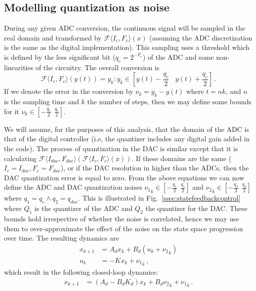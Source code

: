 \documentclass[runningheads,a4paper]{llncs}
\begin{document}
\subsection{Modelling quantization as noise} \label{appendix:quantization-noise}

During any given ADC conversion, the continuous signal will be sampled in
the real domain and transformed by $\mathcal{F}\langle I_{c},F_{c} \rangle
(x)$ (assuming the ADC discretization is the same as the digital
implementation).  This sampling uses a threshold which is defined by the
less significant bit ($q_{c}=2^{-F_c}$) of the ADC and some non-linearities
of the circuitry.  The overall conversion is
%
$$\mathcal{F}\langle I_{c},F_{c} \rangle(y(t)) = y_k :
y_k \in \left[y(t)-\frac{q_{c}}{2}\ \ \ \ y(t)+\frac{q_{c}}{2}\right] \,.$$
%
If we denote the error in the conversion by $\nu_k=y_k-y(t)$ where $t = nk$,
and $n$ is the sampling time and $k$ the number of steps, then we may define
some bounds for it $\nu_k \in [-\frac{q_{c}}{2}\ \ \frac{q_{c}}{2}]$.

We will assume, for the purposes of this analysis, that the domain of the
ADC is that of the digital controller (i.e, the quantizer includes any
digital gain added in the code).  The process of quantization in the DAC is
similar except that it is calculating $\mathcal{F}\langle I_{dac},F_{dac}
\rangle (\mathcal{F}\langle I_{c},F_{c} \rangle (x)) $.  If these domains
are the same ($I_{c}=I_{dac},\allowbreak F_{c}=F_{dac}$), or if the DAC
resolution in higher than the ADCs, then the DAC quantization error is equal
to zero.  From the above equations we can now define the ADC and DAC
quantization noises ${\nu_1}_k \in [-\frac{q_1}{2}\ \ \frac{q_1}{2}]$ and
${\nu_2}_k \in [-\frac{q_2}{2}\ \ \frac{q_2}{2}]$ where $q_1=q_{c} \wedge
q_2=q_\mathit{dac}$.  This is illustrated in
Fig.~\ref{ssec:statefeedbackcontrol} where $Q_1$ is the quantizer of the ADC
and $Q_2$ the quantizer for the DAC.  These bounds hold irrespective of
whether the noise is correlated, hence we may use them to over-approximate
the effect of the noise on the state space progression over time.  The
resulting dynamics are
%
\begin{align}
\label{eq:pre_quantization}
{x}_{k+1} &= {A}_d{x}_k+{B}_d({u}_k+{{\nu}_2}_k)\\
u_k&=-K{x}_{k}+{{\nu}_1}_k \,,
\end{align}
%
which result in the following closed-loop dynamics:
%
\begin{align}
\label{eq:quantization}
{x}_{k+1} &= ({A}_d-{B}_d{K}_d) {x}_k+{B}_d{{\nu}_2}_k +{{\nu}_1}_k \,. 
\end{align}
\end{document}
